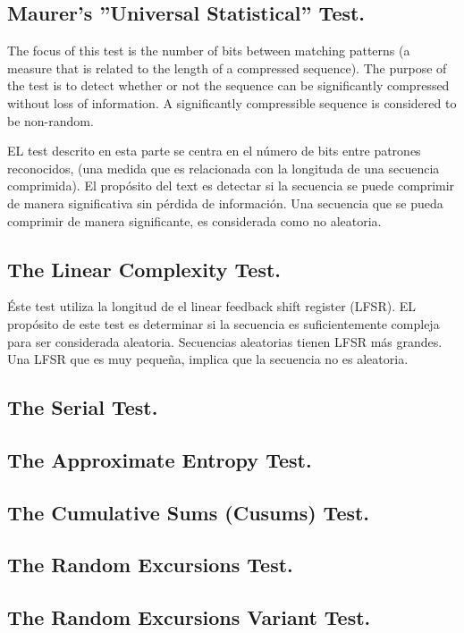 \documentclass{llncs}
\theoremstyle{plane}
\begin{document}
\subsection{Maurer's ''Universal Statistical'' Test.}
The focus of this test is the number of bits between matching patterns (a measure that is related to the
length of a compressed sequence). The purpose of the test is to detect whether or not the sequence can be
significantly compressed without loss of information. A significantly compressible sequence is
considered to be non-random.

EL test descrito en esta parte se centra en el número de bits entre patrones reconocidos, (una medida que es relacionada con la longituda de una secuencia comprimida). El propósito del text es detectar si la secuencia se puede comprimir de manera significativa sin pérdida de información. Una secuencia que se pueda comprimir de manera significante, es considerada como no aleatoria.

\subsection{The Linear Complexity Test.}
Éste test utiliza la longitud de el linear feedback shift register (LFSR). EL propósito de este test es determinar si la secuencia es suficientemente compleja para ser considerada aleatoria. Secuencias aleatorias tienen LFSR más grandes. Una LFSR que es muy pequeña, implica que la secuencia no es aleatoria.

\subsection{The Serial Test.}


\subsection{The Approximate Entropy Test.}
\subsection{The Cumulative Sums (Cusums) Test.}
\subsection{The Random Excursions Test.}
\subsection{The Random Excursions Variant Test.}
\end{document}
